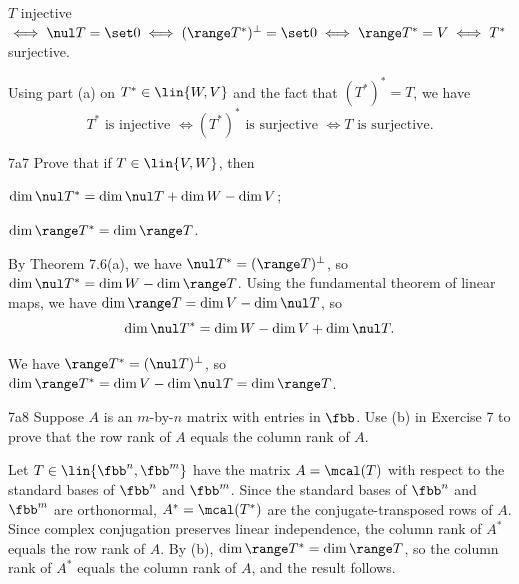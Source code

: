 \begin{solenum}
    \item $T$ injective $\iff \nul T = \set 0 \iff (\range T^\ast)^\perp = \set 0 \iff \range T^\ast = V \iff T^\ast$ surjective.
    \item Using part (a) on $T^\ast \in \lin{W, V}$ and the fact that $(T^\ast)^\ast = T$, we have
    \[
        T^\ast \text{ is injective } \iff (T^\ast)^\ast \text{ is surjective } \iff T \text{ is surjective}.
    \]
\end{solenum}

\begin{exercise}{7a7}
    Prove that if $T \in \lin{V, W}$, then
    \begin{subexercises}
        \item $\dim \nul T^\ast = \dim \nul T + \dim W - \dim V$;
        \item $\dim \range T^\ast = \dim \range T$.
    \end{subexercises}
\end{exercise}

\begin{solenum}
    \item By Theorem 7.6(a), we have $\nul T^\ast = (\range T)^\perp$, so $\dim \nul T^\ast = \dim W - \dim \range T$.
    Using the fundamental theorem of linear maps, we have $\dim \range T = \dim V - \dim \nul T$, so
    \[
        \dim \nul T^\ast = \dim W - \dim V + \dim \nul T.
    \]
    \item We have $\range T^\ast = (\nul T)^\perp$, so $\dim \range T^\ast = \dim V - \dim \nul T = \dim \range T$.
\end{solenum}

\begin{exercise}{7a8}
    Suppose $A$ is an $m$-by-$n$ matrix with entries in $\fbb$.
    Use (b) in Exercise 7 to prove that the row rank of $A$ equals the column rank of $A$.

\end{exercise}

\begin{sol}
    Let $T \in \lin{\fbb^n, \fbb^m}$ have the matrix $A = \mcal(T)$ with respect to the standard bases of $\fbb^n$ and $\fbb^m$.
    Since the standard bases of $\fbb^n$ and $\fbb^m$ are orthonormal, $A^\ast = \mcal(T^\ast)$ are the conjugate-transposed rows of $A$.
    Since complex conjugation preserves linear independence, the column rank of $A^\ast$ equals the row rank of $A$.
    By (b), $\dim \range T^\ast = \dim \range T$, so the column rank of $A^\ast$ equals the column rank of $A$, and the result follows.
\end{sol}

